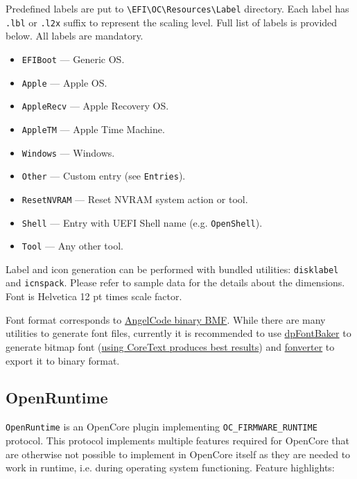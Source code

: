 \documentclass[]{article}
\makeatletter
\providecommand{\tightlist}{%
  \setlength{\itemsep}{0pt}\setlength{\parskip}{0pt}}
\renewcommand{\label}[1]{%
\zref@wrapper@immediate{\oldlabel{#1}}}  %
\makeatother
\begin{document}
Predefined labels are put to \texttt{\textbackslash EFI\textbackslash OC\textbackslash Resources\textbackslash Label}
directory. Each label has \texttt{.lbl} or \texttt{.l2x} suffix to represent the scaling level.
Full list of labels is provided below. All labels are mandatory.

\begin{itemize}
\tightlist
  \item \texttt{EFIBoot} --- Generic OS.
  \item \texttt{Apple} --- Apple OS.
  \item \texttt{AppleRecv} --- Apple Recovery OS.
  \item \texttt{AppleTM} --- Apple Time Machine.
  \item \texttt{Windows} --- Windows.
  \item \texttt{Other} --- Custom entry (see \texttt{Entries}).
  \item \texttt{ResetNVRAM} --- Reset NVRAM system action or tool.
  \item \texttt{Shell} --- Entry with UEFI Shell name (e.g. \texttt{OpenShell}).
  \item \texttt{Tool} --- Any other tool.
\end{itemize}

Label and icon generation can be performed with bundled utilities: \texttt{disklabel} and
\texttt{icnspack}. Please refer to sample data for the details about the dimensions.
Font is Helvetica 12 pt times scale factor.

Font format corresponds to \href{https://www.angelcode.com/products/bmfont}{AngelCode binary BMF}.
While there are many utilities to generate font files, currently it is recommended to use
\href{https://github.com/danpla/dpfontbaker}{dpFontBaker} to generate bitmap font
(\href{https://github.com/danpla/dpfontbaker/pull/1}{using CoreText produces best results})
and \href{https://github.com/usr-sse2/fonverter}{fonverter} to export it to binary format.

\subsection{OpenRuntime}\label{uefiruntime}

\texttt{OpenRuntime} is an OpenCore plugin implementing \texttt{OC\_FIRMWARE\_RUNTIME} protocol.
This protocol implements multiple features required for OpenCore that are otherwise not possible
to implement in OpenCore itself as they are needed to work in runtime, i.e. during operating system
functioning. Feature highlights:
\end{document}
